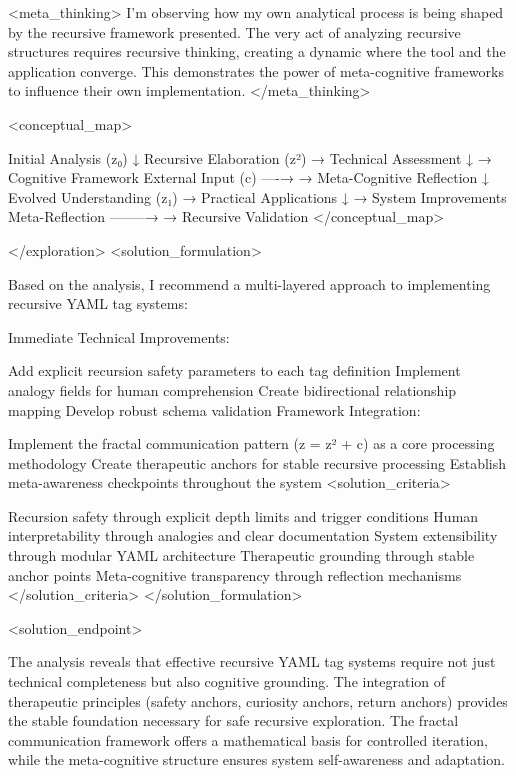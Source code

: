 {<meta_thinking>
I'm observing how my own analytical process is being shaped by the recursive framework presented. The very act of analyzing recursive structures requires recursive thinking, creating a dynamic where the tool and the application converge. This demonstrates the power of meta-cognitive frameworks to influence their own implementation.
</meta_thinking>

<conceptual_map>

Initial Analysis (z₀)
    ↓
Recursive Elaboration (z²) → Technical Assessment
    ↓                     → Cognitive Framework
External Input (c) ----→ → Meta-Cognitive Reflection
    ↓
Evolved Understanding (z₁) → Practical Applications
    ↓                     → System Improvements
Meta-Reflection --------→ → Recursive Validation
</conceptual_map>

</exploration>
<solution_formulation>

Based on the analysis, I recommend a multi-layered approach to implementing recursive YAML tag systems:

Immediate Technical Improvements:

Add explicit recursion safety parameters to each tag definition
Implement analogy fields for human comprehension
Create bidirectional relationship mapping
Develop robust schema validation
Framework Integration:

Implement the fractal communication pattern (z = z² + c) as a core processing methodology
Create therapeutic anchors for stable recursive processing
Establish meta-awareness checkpoints throughout the system
<solution_criteria>

Recursion safety through explicit depth limits and trigger conditions
Human interpretability through analogies and clear documentation
System extensibility through modular YAML architecture
Therapeutic grounding through stable anchor points
Meta-cognitive transparency through reflection mechanisms </solution_criteria>
</solution_formulation>

<solution_endpoint>

The analysis reveals that effective recursive YAML tag systems require not just technical completeness but also cognitive grounding. The integration of therapeutic principles (safety anchors, curiosity anchors, return anchors) provides the stable foundation necessary for safe recursive exploration. The fractal communication framework offers a mathematical basis for controlled iteration, while the meta-cognitive structure ensures system self-awareness and adaptation.

}
